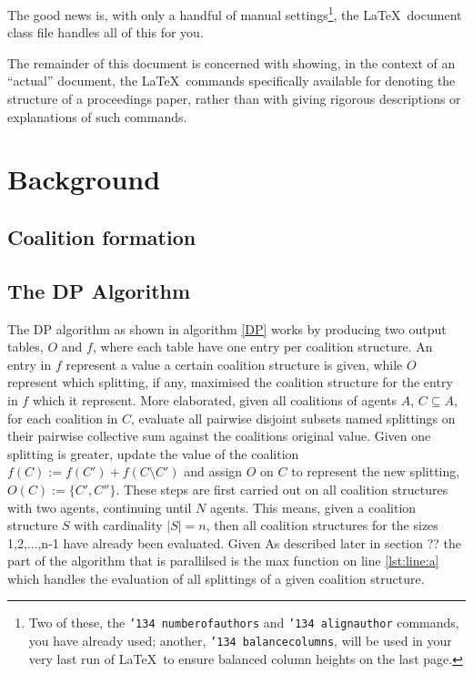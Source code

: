 \documentclass{aamas2012}
\begin{document}
The good news is, with only a handful of manual
settings\footnote{Two of these, the {\texttt{\char'134 numberofauthors}}
and {\texttt{\char'134 alignauthor}} commands, you have
already used; another, {\texttt{\char'134 balancecolumns}}, will
be used in your very last run of \LaTeX\ to ensure
balanced column heights on the last page.}, the \LaTeX\ document
class file handles all of this for you.

The remainder of this document is concerned with showing, in
the context of an ``actual'' document, the \LaTeX\ commands
specifically available for denoting the structure of a
proceedings paper, rather than with giving rigorous descriptions
or explanations of such commands.

\section{Background}

\subsection{Coalition formation}


\subsection{The {\secit DP} Algorithm} 
The DP algorithm as shown in algorithm \ref{DP} works by producing two output tables, $O$ and $f$, 
where each table have one entry per coalition structure. 
An entry in $f$ represent a value a certain coalition structure is given, 
while $O$ represent which splitting, if any, maximised the coalition structure for the entry in $f$ which it represent.
More elaborated, given all coalitions of agents $A$, $C\subseteq A$, for each coalition in $C$, evaluate all
pairwise disjoint subsets named splittings on their pairwise collective sum against the coalitions
original value. Given one splitting is greater, update the value of the coalition $f(C) := f(C') + f(C\setminus C')$
and assign $O$ on $C$ to represent the new splitting, $O(C) := \{C',C''\}$. These steps are first carried out
on all coalition structures with two agents, continuing until $N$ agents. 
This means, given a coalition structure $S$ with cardinality $|S| = n$, then all coalition structures
for the sizes 1,2,...,n-1 have already been evaluated. Given 
As described later in section ?? the part of the algorithm that is parallilsed is the max function on line \ref{lst:line:a}
which handles the evaluation of all splittings of a given coalition structure.
\end{document}
